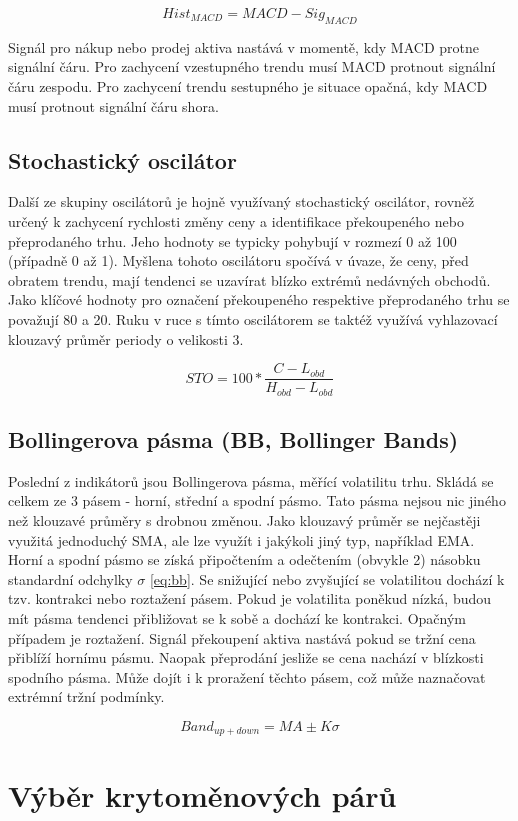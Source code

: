 \begin{equation}
    Hist_{MACD} = MACD - Sig_{MACD}
    \label{eq:macdhist}
\end{equation}

Signál pro nákup nebo prodej aktiva nastává v momentě, kdy MACD protne signální čáru. Pro zachycení vzestupného trendu musí MACD protnout signální čáru zespodu. Pro zachycení
trendu sestupného je situace opačná, kdy MACD musí protnout signální čáru shora. %

\subsection{Stochastický oscilátor}
Další ze skupiny oscilátorů je hojně využívaný stochastický oscilátor, rovněž určený k zachycení rychlosti změny ceny a identifikace překoupeného nebo přeprodaného trhu. Jeho
hodnoty se typicky pohybují v rozmezí 0 až 100 (případně 0 až 1). Myšlena tohoto oscilátoru spočívá v úvaze, že ceny, před obratem trendu, mají tendenci se uzavírat blízko extrémů
nedávných obchodů. Jako klíčové hodnoty pro označení překoupeného respektive přeprodaného trhu se považují 80 a 20. Ruku v ruce s tímto oscilátorem se taktéž využívá vyhlazovací
klouzavý průměr periody o velikosti 3.

\begin{equation}
    STO = 100 * \frac{C  - L_{obd}}{H_{obd} - L_{obd}}
    \label{eq:sto}
\end{equation}


\subsection{Bollingerova pásma (BB, Bollinger Bands)}
Poslední z indikátorů jsou Bollingerova pásma, měřící volatilitu trhu. Skládá se celkem ze 3 pásem - horní, střední a spodní pásmo. Tato pásma nejsou nic jiného než klouzavé průměry
s drobnou změnou. Jako klouzavý průměr se nejčastěji využitá jednoduchý SMA, ale lze využít i jakýkoli jiný typ, například EMA. Horní a spodní pásmo se získá připočtením a odečtením
(obvykle 2) násobku standardní odchylky $\sigma$ \ref{eq:bb}. Se snižující nebo zvyšující se volatilitou dochází k tzv. kontrakci nebo roztažení pásem. Pokud je volatilita poněkud nízká, budou mít
pásma tendenci přibližovat se k sobě a dochází ke kontrakci. Opačným případem je roztažení. Signál překoupení aktiva nastává pokud se tržní cena přiblíží hornímu pásmu. Naopak přeprodání
jesliže se cena nachází v blízkosti spodního pásma. Může dojít i k proražení těchto pásem, což může naznačovat extrémní tržní podmínky.

\begin{equation}
    Band_{up + down} = MA \pm K\sigma
    \label{eq:bb}
\end{equation}

\section{Výběr krytoměnových párů}
\label{sec:ChoosingCryptopairs}

\endinput